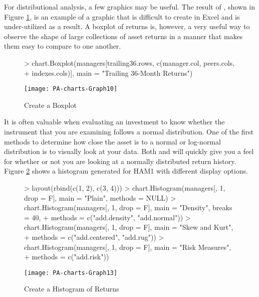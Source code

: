 \documentclass[12pt,letterpaper,english]{article}
\begin{document}
For distributional analysis, a few graphics may be useful. The result
of , shown in Figure \ref{fig:Create-a-Boxplot},
is an example of a graphic that is difficult to create in Excel and
is under-utilized as a result. A boxplot of returns is, however, a
very useful way to observe the shape of large collections of asset
returns in a manner that makes them easy to compare to one another.

%
\begin{figure}

\caption{Create a Boxplot}

\label{fig:Create-a-Boxplot}

\begin{center}

\begin{Schunk}
\begin{Sinput}
> chart.Boxplot(managers[trailing36.rows, c(manager.col, peers.cols, 
+     indexes.cols)], main = "Trailing 36-Month Returns")
\end{Sinput}
\end{Schunk}
\texttt{[image: PA-charts-Graph10]}

\end{center}
\end{figure}


It is often valuable when evaluating an investment to know whether
the instrument that you are examining follows a normal distribution.
One of the first methods to determine how close the asset is to a
normal or log-normal distribution is to visually look at your data.
Both  and 
will quickly give you a feel for whether or not you are looking at
a normally distributed return history. Figure \ref{fig:Create-a-Histogram}
shows a histogram generated for HAM1 with different display options.

%
\begin{figure}

\caption{Create a Histogram of Returns}

\label{fig:Create-a-Histogram}

\begin{center}

\begin{Schunk}
\begin{Sinput}
> layout(rbind(c(1, 2), c(3, 4)))
> chart.Histogram(managers[, 1, drop = F], main = "Plain", methods = NULL)
> chart.Histogram(managers[, 1, drop = F], main = "Density", breaks = 40, 
+     methods = c("add.density", "add.normal"))
> chart.Histogram(managers[, 1, drop = F], main = "Skew and Kurt", 
+     methods = c("add.centered", "add.rug"))
> chart.Histogram(managers[, 1, drop = F], main = "Risk Measures", 
+     methods = c("add.risk"))
\end{Sinput}
\end{Schunk}
\texttt{[image: PA-charts-Graph13]}

\end{center}
\end{figure}
\end{document}
